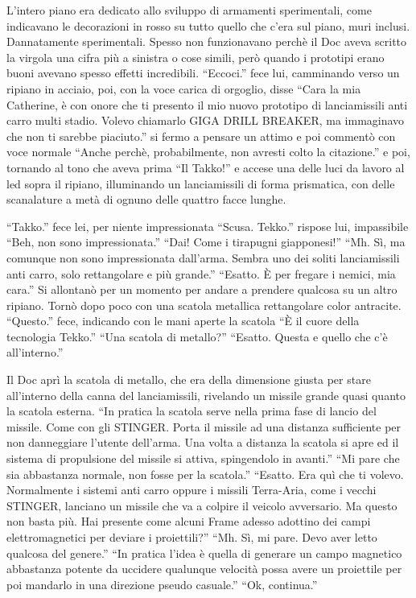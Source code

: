     L'intero piano era dedicato allo sviluppo di armamenti sperimentali, come indicavano le decorazioni in rosso su
    tutto quello che c'era sul piano, muri inclusi. Dannatamente sperimentali. Spesso non
    funzionavano perchè il Doc aveva scritto la virgola una cifra più a sinistra o cose simili, però quando i prototipi
    erano buoni avevano spesso effetti incredibili. ``Eccoci.'' fece lui, camminando verso un ripiano in acciaio, poi,
    con la voce carica di orgoglio, disse ``Cara
    la mia Catherine, è con onore che ti presento il mio nuovo prototipo di lanciamissili anti carro multi stadio.
    Volevo chiamarlo GIGA DRILL BREAKER, ma immaginavo che non ti sarebbe piaciuto.'' si fermo a pensare un attimo e poi
    commentò con voce normale ``Anche perchè, probabilmente, non avresti colto la citazione.'' e poi, tornando al tono
    che aveva prima ``Il Takko!'' e accese una delle luci da lavoro al led sopra il ripiano, illuminando un
    lanciamissili di forma prismatica, con delle scanalature a metà di ognuno delle quattro facce lunghe.

    ``Takko.'' fece lei, per niente impressionata ``Scusa. Tekko.'' rispose lui, impassibile ``Beh, non sono
    impressionata.'' ``Dai! Come i tirapugni giapponesi!'' ``Mh. Sì, ma comunque non sono impressionata dall'arma.
    Sembra uno dei soliti lanciamissili anti carro, solo rettangolare e più grande.'' ``Esatto. È per fregare i nemici,
    mia cara.'' Si allontanò per un momento per andare a prendere qualcosa su un altro ripiano. Tornò dopo poco con una
    scatola metallica rettangolare color antracite. ``Questo.'' fece, indicando con le mani aperte la scatola ``È il
    cuore della tecnologia Tekko.'' ``Una scatola di metallo?'' ``Esatto. Questa e quello che c'è all'interno.''

    Il Doc aprì la scatola di metallo, che era della dimensione giusta per stare all'interno della canna del
    lanciamissili, rivelando un missile grande quasi quanto la scatola esterna. ``In pratica la scatola serve nella
    prima fase di lancio del missile. Come con gli STINGER. Porta il missile ad una distanza sufficiente per non
    danneggiare l'utente dell'arma. Una volta a distanza la scatola si apre ed il sistema di propulsione del missile si
    attiva, spingendolo in avanti.'' ``Mi pare che sia abbastanza normale, non fosse per la scatola.'' ``Esatto. Era quì
    che ti volevo. Normalmente i sistemi anti carro oppure i missili Terra-Aria, come i vecchi STINGER, lanciano un
    missile che va a colpire il veicolo avversario. Ma questo non basta più. Hai presente come alcuni Frame adesso
    adottino dei campi elettromagnetici per deviare i proiettili?'' ``Mh. Sì, mi pare. Devo aver letto qualcosa del
    genere.'' ``In pratica l'idea è quella di generare un campo magnetico abbastanza potente da uccidere qualunque
    velocità possa avere un proiettile per poi mandarlo in una direzione pseudo casuale.'' ``Ok, continua.''

